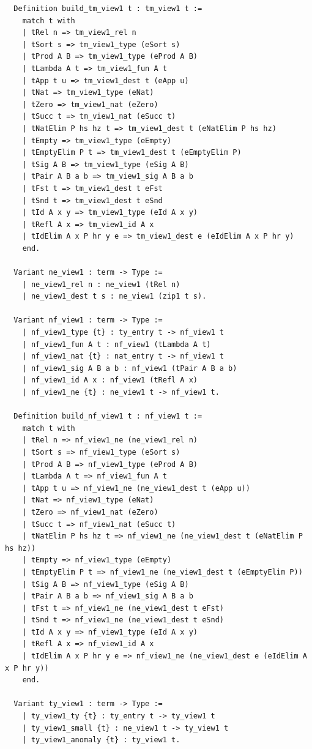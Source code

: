 \begin{lstlisting}
  Definition build_tm_view1 t : tm_view1 t :=
    match t with
    | tRel n => tm_view1_rel n
    | tSort s => tm_view1_type (eSort s)
    | tProd A B => tm_view1_type (eProd A B)
    | tLambda A t => tm_view1_fun A t
    | tApp t u => tm_view1_dest t (eApp u)
    | tNat => tm_view1_type (eNat)
    | tZero => tm_view1_nat (eZero)
    | tSucc t => tm_view1_nat (eSucc t)
    | tNatElim P hs hz t => tm_view1_dest t (eNatElim P hs hz)
    | tEmpty => tm_view1_type (eEmpty)
    | tEmptyElim P t => tm_view1_dest t (eEmptyElim P)
    | tSig A B => tm_view1_type (eSig A B)
    | tPair A B a b => tm_view1_sig A B a b
    | tFst t => tm_view1_dest t eFst
    | tSnd t => tm_view1_dest t eSnd
    | tId A x y => tm_view1_type (eId A x y)
    | tRefl A x => tm_view1_id A x
    | tIdElim A x P hr y e => tm_view1_dest e (eIdElim A x P hr y)
    end.

  Variant ne_view1 : term -> Type :=
    | ne_view1_rel n : ne_view1 (tRel n)
    | ne_view1_dest t s : ne_view1 (zip1 t s).

  Variant nf_view1 : term -> Type :=
    | nf_view1_type {t} : ty_entry t -> nf_view1 t
    | nf_view1_fun A t : nf_view1 (tLambda A t)
    | nf_view1_nat {t} : nat_entry t -> nf_view1 t
    | nf_view1_sig A B a b : nf_view1 (tPair A B a b)
    | nf_view1_id A x : nf_view1 (tRefl A x)
    | nf_view1_ne {t} : ne_view1 t -> nf_view1 t.

  Definition build_nf_view1 t : nf_view1 t :=
    match t with
    | tRel n => nf_view1_ne (ne_view1_rel n)
    | tSort s => nf_view1_type (eSort s)
    | tProd A B => nf_view1_type (eProd A B)
    | tLambda A t => nf_view1_fun A t
    | tApp t u => nf_view1_ne (ne_view1_dest t (eApp u))
    | tNat => nf_view1_type (eNat)
    | tZero => nf_view1_nat (eZero)
    | tSucc t => nf_view1_nat (eSucc t)
    | tNatElim P hs hz t => nf_view1_ne (ne_view1_dest t (eNatElim P hs hz))
    | tEmpty => nf_view1_type (eEmpty)
    | tEmptyElim P t => nf_view1_ne (ne_view1_dest t (eEmptyElim P))
    | tSig A B => nf_view1_type (eSig A B)
    | tPair A B a b => nf_view1_sig A B a b
    | tFst t => nf_view1_ne (ne_view1_dest t eFst)
    | tSnd t => nf_view1_ne (ne_view1_dest t eSnd)
    | tId A x y => nf_view1_type (eId A x y)
    | tRefl A x => nf_view1_id A x
    | tIdElim A x P hr y e => nf_view1_ne (ne_view1_dest e (eIdElim A x P hr y))
    end.

  Variant ty_view1 : term -> Type :=
    | ty_view1_ty {t} : ty_entry t -> ty_view1 t
    | ty_view1_small {t} : ne_view1 t -> ty_view1 t
    | ty_view1_anomaly {t} : ty_view1 t.


\end{lstlisting}
